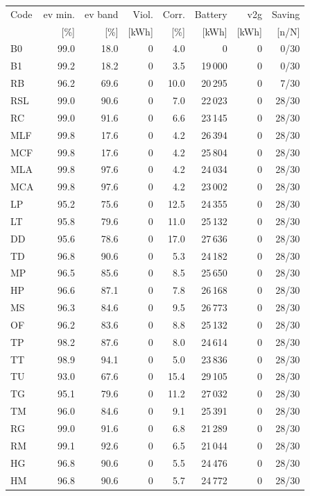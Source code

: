 \noindent\begin{minipage}{\textwidth}\singlespacing\captionsetup{font=footnotesize}
\setlength{\tabcolsep}{4pt}
\renewcommand{\arraystretch}{1.0}
\label{tab:full-scorecard-1-1}
\fontsize{8}{9}\selectfont
\begin{tabular*}{\textwidth}{@{\extracolsep{\fill}}lrrrrrrr@{}}
\toprule
Code & \gls{ev} min. & \gls{ev} band & Viol. & Corr. & Battery & \gls{v2g} & Saving\\
 & [\%] & [\%] & [kWh] & [\%] & [kWh] & [kWh] & [n/N]\\
\midrule
B0 & 99.0 & 18.0 & 0 & 4.0 & 0 & 0 & 0/30\\
B1 & 99.2 & 18.2 & 0 & 3.5 & 19\,000 & 0 & 0/30\\
RB & 96.2 & 69.6 & 0 & 10.0 & 20\,295 & 0 & 7/30\\
RSL & 99.0 & 90.6 & 0 & 7.0 & 22\,023 & 0 & 28/30\\
RC & 99.0 & 91.6 & 0 & 6.6 & 23\,145 & 0 & 28/30\\
MLF & 99.8 & 17.6 & 0 & 4.2 & 26\,394 & 0 & 28/30\\
MCF & 99.8 & 17.6 & 0 & 4.2 & 25\,804 & 0 & 28/30\\
MLA & 99.8 & 97.6 & 0 & 4.2 & 24\,034 & 0 & 28/30\\
MCA & 99.8 & 97.6 & 0 & 4.2 & 23\,002 & 0 & 28/30\\
LP & 95.2 & 75.6 & 0 & 12.5 & 24\,355 & 0 & 28/30\\
LT & 95.8 & 79.6 & 0 & 11.0 & 25\,132 & 0 & 28/30\\
DD & 95.6 & 78.6 & 0 & 17.0 & 27\,636 & 0 & 28/30\\
TD & 96.8 & 90.6 & 0 & 5.3 & 24\,182 & 0 & 28/30\\
MP & 96.5 & 85.6 & 0 & 8.5 & 25\,650 & 0 & 28/30\\
HP & 96.6 & 87.1 & 0 & 7.8 & 26\,168 & 0 & 28/30\\
MS & 96.3 & 84.6 & 0 & 9.5 & 26\,773 & 0 & 28/30\\
OF & 96.2 & 83.6 & 0 & 8.8 & 25\,132 & 0 & 28/30\\
TP & 98.2 & 87.6 & 0 & 8.0 & 24\,614 & 0 & 28/30\\
TT & 98.9 & 94.1 & 0 & 5.0 & 23\,836 & 0 & 28/30\\
TU & 93.0 & 67.6 & 0 & 15.4 & 29\,105 & 0 & 28/30\\
TG & 95.1 & 79.6 & 0 & 11.2 & 27\,032 & 0 & 28/30\\
TM & 96.0 & 84.6 & 0 & 9.1 & 25\,391 & 0 & 28/30\\
RG & 99.0 & 91.6 & 0 & 6.8 & 21\,289 & 0 & 28/30\\
RM & 99.1 & 92.6 & 0 & 6.5 & 21\,044 & 0 & 28/30\\
HG & 96.8 & 90.6 & 0 & 5.5 & 24\,476 & 0 & 28/30\\
HM & 96.8 & 90.6 & 0 & 5.7 & 24\,772 & 0 & 28/30\\
\bottomrule\end{tabular*}
\end{minipage}\par\medskip
